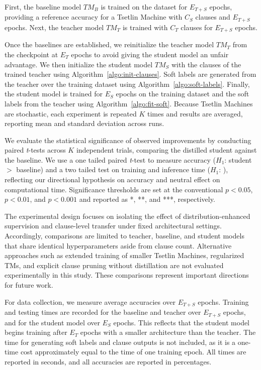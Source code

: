 \documentclass[sn-mathphys-num]{sn-jnl}%
\theoremstyle{thmstyleone}%
\theoremstyle{thmstyletwo}%
\theoremstyle{thmstylethree}%
\begin{document}
First, the baseline model $TM_B$ is trained on the dataset for $E_{T+S}$ epochs, providing a reference accuracy for a Tsetlin Machine with $C_S$ clauses and $E_{T+S}$ epochs. Next, the teacher model $TM_T$ is trained with $C_T$ clauses for $E_{T+S}$ epochs.

Once the baselines are established, we reinitialize the teacher model $TM_T$ from the checkpoint at $E_T$ epochs to avoid giving the student model an unfair advantage. We then initialize the student model $TM_S$ with the clauses of the trained teacher using Algorithm~\ref{algo:init-clauses}. Soft labels are generated from the teacher over the training dataset using Algorithm~\ref{algo:soft-labels}. Finally, the student model is trained for $E_S$ epochs on the training dataset and the soft labels from the teacher using Algorithm~\ref{algo:fit-soft}. Because Tsetlin Machines are stochastic, each experiment is repeated $K$ times and results are averaged, reporting mean and standard deviation across runs. 

We evaluate the statistical significance of observed improvements by conducting paired \textit{t}-tests across $K$ independent trials, comparing the distilled student against the baseline. 
We use a one tailed paired \textit{t}-test to measure accuracy ($H_1$: student $>$ baseline) and a two tailed test on training and inference time ($H_1$: ), reflecting our directional hypothesis on accuracy and neutral effect on computational time. Significance thresholds are set at the conventional $p < 0.05$, $p < 0.01$, and $p < 0.001$ and reported as *, **, and ***, respectively.

The experimental design focuses on isolating the effect of distribution-enhanced supervision and clause-level transfer under fixed architectural settings. Accordingly, comparisons are limited to teacher, baseline, and student models that share identical hyperparameters aside from clause count. Alternative approaches such as extended training of smaller Tsetlin Machines, regularized TMs, and explicit clause pruning without distillation are not evaluated experimentally in this study. These comparisons represent important directions for future work.

For data collection, we measure average accuracies over $E_{T+S}$ epochs. Training and testing times are recorded for the baseline and teacher over $E_{T+S}$ epochs, and for the student model over $E_S$ epochs. This reflects that the student model begins training after $E_T$ epochs with a smaller architecture than the teacher. The time for generating soft labels and clause outputs is not included, as it is a one-time cost approximately equal to the time of one training epoch. All times are reported in seconds, and all accuracies are reported in percentages.
\end{document}
